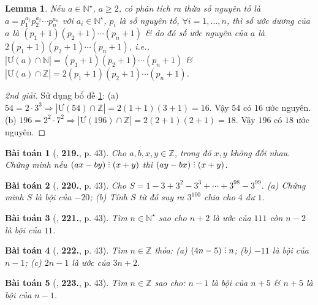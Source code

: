 \documentclass{article}
\numberwithin{equation}{section}
\newtheorem{baitoan}{Bài toán}
\newtheorem{lemma}{Lemma}[section]
\DeclareRobustCommand{\divby}{%
	\mathrel{\vbox{\baselineskip.65ex\lineskiplimit0pt\hbox{.}\hbox{.}\hbox{.}}}%
}
\begin{document}
\begin{lemma}
	\label{lemma: number of divisor}
	Nếu $a\in\mathbb{N}^\star$, $a\ge2$, có phân tích ra thừa số nguyên tố là $a = p_1^{a_1}p_2^{a_2}\cdots p_n^{a_n}$ với $a_i\in\mathbb{N}^\star$, $p_i$ là số nguyên tố, $\forall i = 1,\ldots,n$, thì số ước dương của $a$ là $(p_1 + 1)(p_2 + 1)\cdots(p_n + 1)$ \& do đó số ước nguyên của $a$ là $2(p_1 + 1)(p_2 + 1)\cdots(p_n + 1)$, i.e., $|\mbox{Ư}(a)\cap\mathbb{N}| = (p_1 + 1)(p_2 + 1)\cdots(p_n + 1)$ \& $|\mbox{Ư}(a)\cap\mathbb{Z}| = 2(p_1 + 1)(p_2 + 1)\cdots(p_n + 1)$.
\end{lemma}

\begin{proof}[2nd giải]
	Sử dụng bổ đề \ref{lemma: number of divisor}: (a) $54 = 2\cdot3^3\Rightarrow|\mbox{Ư}(54)\cap\mathbb{Z}| = 2(1 + 1)(3 + 1) = 16$. Vậy $54$ có $16$ ước nguyên. (b) $196 =2^2\cdot7^2\Rightarrow|\mbox{Ư}(196)\cap\mathbb{Z}| = 2(2 + 1)(2 + 1) = 18$. Vậy $196$ có $18$ ước nguyên.
\end{proof}

\begin{baitoan}[\cite{Tuyen_Toan_6}, \textbf{219.}, p. 43]
	Cho $a,b,x,y\in\mathbb{Z}$, trong đó $x,y$ không đối nhau. Chứng minh nếu $(ax - by)\divby(x + y)$  thì $(ay - bx)\divby(x + y)$.
\end{baitoan}

\begin{baitoan}[\cite{Tuyen_Toan_6}, \textbf{220.}, p. 43]
	Cho $S = 1 - 3 + 3^2 - 3^3 + \cdots + 3^{98} - 3^{99}$. (a) Chứng minh $S$ là bội của $-20$; (b) Tính $S$ từ đó suy ra $3^{100}$ chia cho $4$ dư $1$.
\end{baitoan}

\begin{baitoan}[\cite{Tuyen_Toan_6}, \textbf{221.}, p. 43]
	Tìm $n\in\mathbb{N}^\star$ sao cho $n + 2$ là ước của $111$ còn $n - 2$ là bội của $11$.
\end{baitoan}

\begin{baitoan}[\cite{Tuyen_Toan_6}, \textbf{222.}, p. 43]
	Tìm $n\in\mathbb{Z}$ thỏa: (a) $(4n - 5)\divby n$; (b) $-11$ là bội của $n - 1$; (c) $2n - 1$ là ước của $3n + 2$.
\end{baitoan}

\begin{baitoan}[\cite{Tuyen_Toan_6}, \textbf{223.}, p. 43]
	Tìm $n\in\mathbb{Z}$ sao cho: $n - 1$ là bội của $n + 5$ \& $n + 5$ là bội của $n - 1$.
\end{baitoan}
\end{document}
